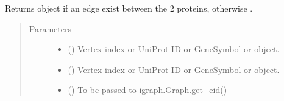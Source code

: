 \documentclass[letterpaper,10pt,english]{sphinxmanual}
\begin{document}
\begin{fulllineitems}
\begin{fulllineitems}
\begin{description}
\end{description}

\end{fulllineitems}


\begin{fulllineitems}
\label{\detokenize{main:pypath.main.PyPath.get_dirs_signs}}
\end{fulllineitems}


\begin{fulllineitems}
\label{\detokenize{main:pypath.main.PyPath.get_edge}}
Returns  object if an edge exist between
the 2 proteins, otherwise .
\begin{quote}\begin{description}
\item[{Parameters}] \leavevmode\begin{itemize}
\item {} 
 (\sphinxstyleliteralemphasis{\sphinxupquote{,}}) \textendash{} Vertex index or UniProt ID or GeneSymbol or 
object.

\item {} 
 (\sphinxstyleliteralemphasis{\sphinxupquote{,}}) \textendash{} Vertex index or UniProt ID or GeneSymbol or 
object.

\item {} 
 () \textendash{} To be passed to igraph.Graph.get\_eid()

\end{itemize}

\end{description}\end{quote}


\end{fulllineitems}
\end{fulllineitems}
\end{document}
